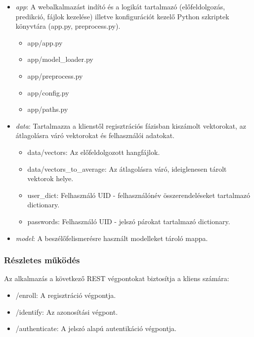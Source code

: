 \begin{itemize}
	\item \emph{app}: A webalkalmazást indító és a logikát tartalmazó (előfeldolgozás, predikció, fájlok kezelése) illetve konfigurációt kezelő Python szkriptek könyvtára (app.py, preprocess.py).
	
	\begin{itemize}
		\item app/app.py
		\item app/model\_loader.py
		\item app/preprocess.py
		\item app/config.py
		\item app/paths.py
	\end{itemize}
	
	\item \emph{data}: Tartalmazza a klienstől regisztrációs fázisban kiszámolt vektorokat, az átlagolásra váró vektorokat és felhasználói adatokat.
	
	\begin{itemize}
		\item data/vectors: Az előfeldolgozott hangfájlok.
		\item data/vectors\_to\_average: Az átlagolásra váró, ideiglenesen tárolt vektorok helye.
		\item user\_dict: Felhasználó UID - felhasználónév összerendeléseket tartalmazó dictionary.
		\item passwords: Felhasználó UID - jelszó párokat tartalmazó dictionary.
	\end{itemize}
	
	\item \emph{model}: A beszélőfelismerésre használt modelleket tároló mappa.
\end{itemize}

\subsubsection{Részletes működés}

Az alkalmazás a következő REST végpontokat biztosítja a kliens számára:

\begin{itemize}
	\item /enroll: A regisztráció végpontja.
	\item /identify: Az azonosítási végpont.
	\item /authenticate: A jelszó alapú autentikáció végpontja.
\end{itemize}


